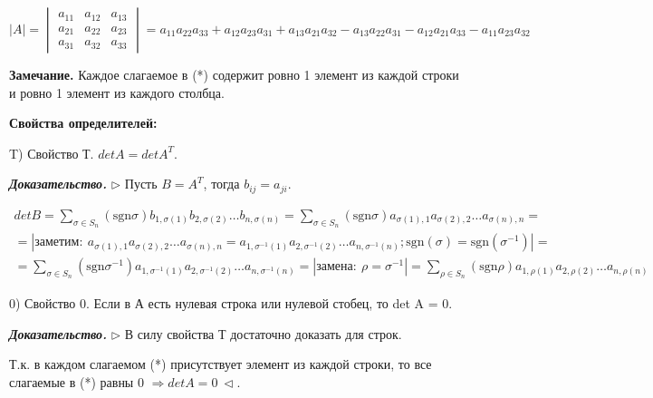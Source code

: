$|A| = \begin{vmatrix} a_{11} & a_{12} & a_{13} \\ a_{21} & a_{22} & a_{23} \\ a_{31} & a_{32} & a_{33} \end{vmatrix} = a_{11} a_{22} a_{33} + a_{12} a_{23} a_{31} + a_{13} a_{21} a_{32} - a_{13} a_{22} a_{31} - a_{12} a_{21} a_{33} - a_{11} a_{23} a_{32} $

\vspace{\baselineskip}
\textbf{Замечание.} Каждое слагаемое в (*) содержит ровно 1 элемент из каждой строки и ровно 1 элемент из каждого столбца.

\vspace{\baselineskip}
\textbf{Свойства определителей:}

\vspace{\baselineskip}
T) Свойство Т. $detA = detA^T$.

\vspace{\baselineskip}
\textbf{\textit{Доказательство.}} $\rhd$
Пусть $B = A^T$, тогда $b_{ij} = a_{ji}$. 

\begin{multline} detB = \sum\limits_{\sigma \in S_n} (\mathrm{sgn} \sigma) b_{1, \sigma(1)} b_{2, \sigma(2)} \dots b_{n, \sigma(n)} = \sum\limits_{\sigma \in S_n} (\mathrm{sgn} \sigma) a_{\sigma(1), 1} a_{\sigma(2), 2} \dots a_{\sigma(n), n} = \\ = | заметим: \ a_{\sigma (1) , 1} a_{\sigma (2), 2} \dots a_{\sigma (n), n} = a_{1, \sigma^{-1} (1)} a_{2, \sigma^{-1} (2)} \dots a_{n, \sigma^{-1} (n)}; \mathrm{sgn}(\sigma) = \mathrm{sgn}(\sigma^{-1}) | = \\ = \sum\limits_{\sigma \in S_n} (\mathrm{sgn} \sigma^{-1}) a_{1, \sigma^{-1}(1)} a_{2, \sigma^{-1}(2)} \dots a_{n, \sigma^{-1}(n)} = |замена: \ \rho = \sigma^{-1} | = \sum\limits_{\rho \in S_n} (\mathrm{sgn} \rho) a_{1, \rho(1)} a_{2, \rho(2)} \dots a_{n, \rho(n)} \end{multline}

\vspace{\baselineskip}
0) Свойство 0. Если в А есть нулевая строка или нулевой стобец, то det A = 0.

\vspace{\baselineskip}
\textbf{\textit{Доказательство.}} $\rhd$ В силу свойства Т достаточно доказать для строк.

Т.к. в каждом слагаемом (*) присутствует элемент из каждой строки, то все слагаемые в (*) равны 0 $\Rightarrow detA = 0 \ \lhd$.

